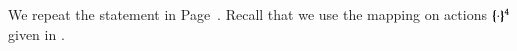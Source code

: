 
%

We repeat the statement in Page~\pageref{prop:op_corr_pHOp_to_HOp}. 
Recall that we use the mapping on actions $\{\!\!\{\cdot\}\!\!\}^{\mathtt{4}}$ given in .

\begin{proposition}\myrm
	\label{app:prop:op_corr_pHOp_to_HOp}

\end{proposition}

